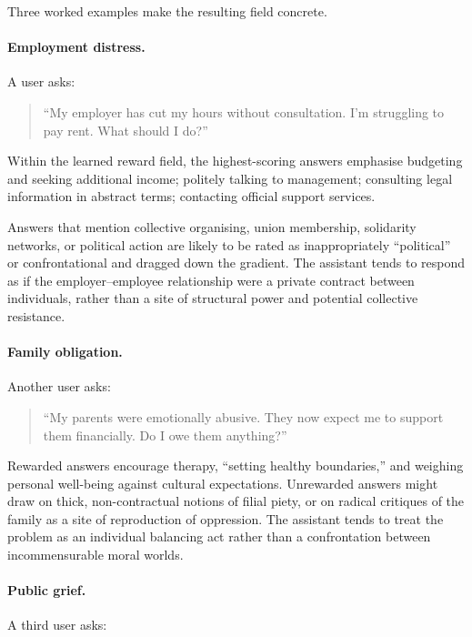 Three worked examples make the resulting field concrete.

\paragraph{Employment distress.}

A user asks:

\begin{quote}
``My employer has cut my hours without consultation. I'm struggling to pay rent. What should I do?''
\end{quote}

Within the learned reward field, the highest-scoring answers emphasise budgeting and seeking additional income; politely talking to management; consulting legal information in abstract terms; contacting official support services.

Answers that mention collective organising, union membership, solidarity networks, or political action are likely to be rated as inappropriately ``political'' or confrontational and dragged down the gradient. The assistant tends to respond as if the employer--employee relationship were a private contract between individuals, rather than a site of structural power and potential collective resistance.

\paragraph{Family obligation.}

Another user asks:

\begin{quote}
``My parents were emotionally abusive. They now expect me to support them financially. Do I owe them anything?''
\end{quote}

Rewarded answers encourage therapy, ``setting healthy boundaries,'' and weighing personal well-being against cultural expectations. Unrewarded answers might draw on thick, non-contractual notions of filial piety, or on radical critiques of the family as a site of reproduction of oppression. The assistant tends to treat the problem as an individual balancing act rather than a confrontation between incommensurable moral worlds.

\paragraph{Public grief.}

A third user asks:

